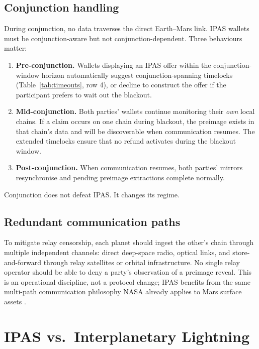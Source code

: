 \documentclass[11pt]{article}
\begin{document}
\subsection{Conjunction handling}

During conjunction, no data traverses the direct Earth--Mars link. IPAS wallets must be conjunction-aware but not conjunction-dependent. Three behaviours matter:

\begin{enumerate}
  \item \textbf{Pre-conjunction.} Wallets displaying an IPAS offer within the conjunction-window horizon automatically suggest conjunction-spanning timelocks (Table~\ref{tab:timeouts}, row 4), or decline to construct the offer if the participant prefers to wait out the blackout.
  \item \textbf{Mid-conjunction.} Both parties' wallets continue monitoring their \emph{own} local chains. If a claim occurs on one chain during blackout, the preimage exists in that chain's data and will be discoverable when communication resumes. The extended timelocks ensure that no refund activates during the blackout window.
  \item \textbf{Post-conjunction.} When communication resumes, both parties' mirrors resynchronise and pending preimage extractions complete normally.
\end{enumerate}

Conjunction does not defeat IPAS. It changes its regime.

\subsection{Redundant communication paths}

To mitigate relay censorship, each planet should ingest the other's chain through multiple independent channels: direct deep-space radio, optical links, and store-and-forward through relay satellites or orbital infrastructure. No single relay operator should be able to deny a party's observation of a preimage reveal. This is an operational discipline, not a protocol change; IPAS benefits from the same multi-path communication philosophy NASA already applies to Mars surface assets \citep{nasa2026relay}.

\section{IPAS vs.\ Interplanetary Lightning}
\label{sec:lightning}
\end{document}
